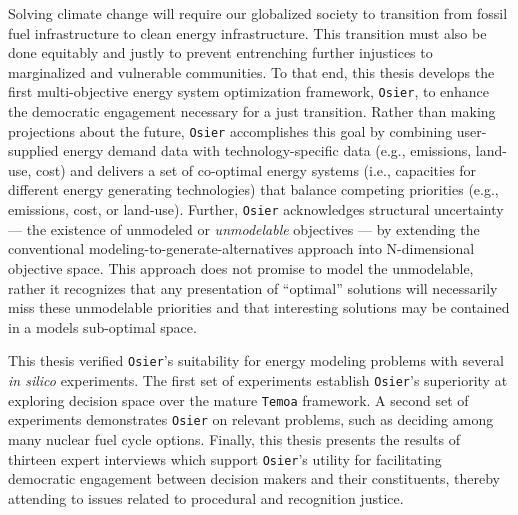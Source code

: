 Solving climate change will require our globalized society to transition from
fossil fuel infrastructure to clean energy infrastructure. This transition must
also be done equitably and justly to prevent entrenching further injustices to
marginalized and vulnerable communities. To that end, this thesis develops the
first multi-objective energy system optimization framework, \texttt{Osier}, to
enhance the democratic engagement necessary for a just transition. Rather than
making projections about the future, \texttt{Osier} accomplishes this goal by
combining user-supplied energy demand data with technology-specific data (e.g.,
emissions, land-use, cost) and delivers a set of co-optimal energy systems
(i.e., capacities for different energy generating technologies) that balance
competing priorities (e.g., emissions, cost, or land-use). Further,
\texttt{Osier} acknowledges structural uncertainty --- the existence of
unmodeled or \textit{unmodelable} objectives --- by extending the conventional
modeling-to-generate-alternatives approach into N-dimensional objective space.
This approach does not promise to model the unmodelable, rather it recognizes
that any presentation of ``optimal'' solutions will necessarily miss these
unmodelable priorities and that interesting solutions may be contained in a
models sub-optimal space.

This thesis verified \texttt{Osier}'s suitability for energy modeling problems
with several \textit{in silico} experiments. The first set of experiments
establish \texttt{Osier}'s superiority at exploring decision space over the
mature \texttt{Temoa} framework. A second set of experiments demonstrates
\texttt{Osier} on relevant problems, such as deciding among many nuclear fuel
cycle options. Finally, this thesis presents the results of thirteen expert
interviews which support \texttt{Osier}'s utility for facilitating democratic
engagement between decision makers and their constituents, thereby attending
to issues related to procedural and recognition justice.